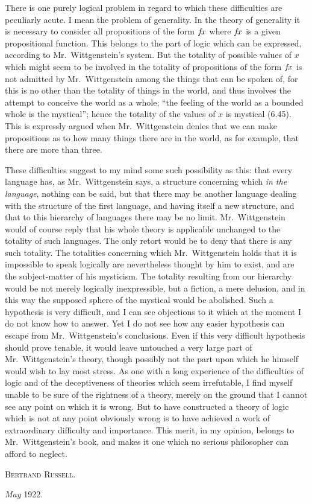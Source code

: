 There is one purely logical problem in regard to which these difficulties are peculiarly acute. I mean the problem of generality. In the theory of generality it is necessary to consider all propositions of the form $f\negthinspace x$ where $f\negthinspace x$ is a given propositional function. This belongs to the part of logic which can be expressed, according to Mr.\ Wittgenstein’s system. But the totality of possible values of $x$ which might seem to be involved in the totality of propositions of the form $f\negthinspace x$ is not admitted by Mr.\ Wittgenstein among the things that can be spoken of, for this is no other than the totality of things in the world, and thus involves the attempt to conceive the world as a whole; “the feeling of the world as a bounded whole is the mystical”; hence the totality of the values of $x$ is mystical (6.45). This is expressly argued when Mr.\ Wittgenstein denies that we can make propositions as to how many things there are in the world, as for example, that there are more than three.

These difficulties suggest to my mind some such possibility as this: that every language has, as Mr.\ Wittgenstein says, a structure concerning which \emph{in the language}, nothing can be said, but that there may be another language dealing with the structure of the first language, and having itself a new structure, and that to this hierarchy of languages there may be no limit. Mr.\ Wittgenstein would of course reply that his whole theory is applicable unchanged to the totality of such languages. The only retort would be to deny that there is any such totality. The totalities concerning which Mr.\ Wittgenstein holds that it is impossible to speak logically are nevertheless thought by him to exist, and are the subject-matter of his mysticism. The totality resulting from our hierarchy would be not merely logically inexpressible, but a fiction, a mere delusion, and in this way the supposed sphere of the mystical would be abolished. Such a hypothesis is very difficult, and I can see objections to it which at the moment I do not know how to answer. Yet I do not see how any easier hypothesis can escape from Mr.\ Wittgenstein’s conclusions. Even if this very difficult hypothesis should prove tenable, it would leave untouched a very large part of Mr.\ Wittgenstein’s theory, though possibly not the part upon which he himself would wish to lay most stress. As one with a long experience of the difficulties of logic and of the deceptiveness of theories which seem irrefutable, I find myself unable to be sure of the rightness of a theory, merely on the ground that I cannot see any point on which it is wrong. But to have constructed a theory of logic which is not at any point obviously wrong is to have achieved a work of extraordinary difficulty and importance. This merit, in my opinion, belongs to Mr.\ Wittgenstein’s book, and makes it one which no serious philosopher can afford to neglect.

\hfill\textsc{Bertrand Russell.}\phantom{xxx}

\textit{May} 1922.